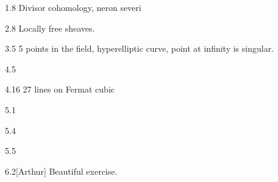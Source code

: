 \begin{manualexercise}{1.8}
	Divisor cohomology, neron severi
\end{manualexercise}

\begin{manualexercise}{2.8}
	Locally free sheaves.
\end{manualexercise}

\begin{manualexercise}{3.5}
	5 points in the field, hyperelliptic curve, point at infinity is singular.
\end{manualexercise}

\begin{manualexercise}{4.5}
	
\end{manualexercise}

\begin{manualexercise}{4.16}
	27 lines on Fermat cubic
\end{manualexercise}

\begin{manualexercise}{5.1}
	
\end{manualexercise}

\begin{manualexercise}{5.4}
	
\end{manualexercise}

\begin{manualexercise}{5.5}
	
\end{manualexercise}

\begin{manualexercise}{6.2}[Arthur]
	Beautiful exercise.
\end{manualexercise}

\printbibliography

